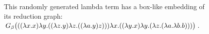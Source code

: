 \begin{figure}[htbp]
{	}

	\caption[$((\lam{x}{x}) \lam{y}{((\lam{z}{y}) \lam{z}{((\lam{a}{y}) z)})}) \lam{x}{((\lam{y}{x}) \lam{y}{(\lam{z}{(\lam{a}{\lam{b}{b}})})})}$]
	{This randomly generated lambda term has a box-like embedding of 
	its reduction graph: $G_\beta\big(((\lambda x.x) \lambda y.((\lambda z.y) \lambda z.((\lambda a.y) z))) \lambda x.((\lambda y.x) \lambda y.(\lambda z.(\lambda a.\lambda b.b)))\big)$.
	}
	\label{fig:images_finite_ex_1_NEATO}
\end{figure}

